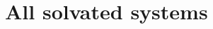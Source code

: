 \documentclass{article}
\begin{document}
%  
%  
  
  \section{All solvated systems}\label{section:solvation}
  
  \newlength{\tempdima}
  \newcommand{\rowname}[1]%
  {\rotatebox{90}{\makebox[\tempdima][c]{\textbf{#1}}}}
  
  \renewcommand{\thesubfigure}{\alph{subfigure}}
  \newcommand{\mycaption}[1]%
  {\refstepcounter{subfigure}\textbf{(\thesubfigure) }{\ignorespaces #1}}  
  
\end{document}
